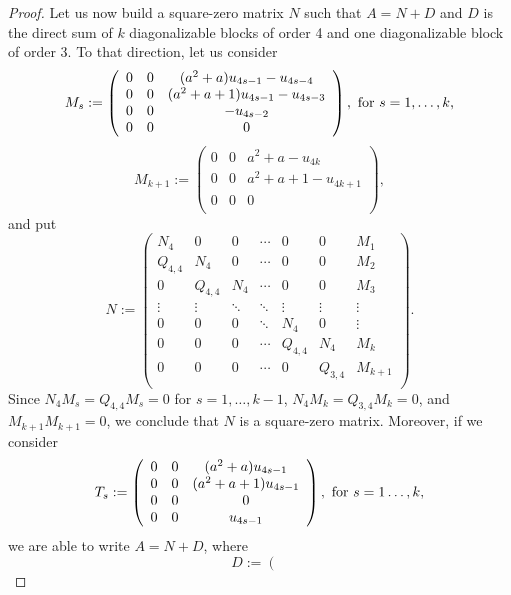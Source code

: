 \documentclass{amsart}
\theoremstyle{definition}
\theoremstyle{remark}
\numberwithin{equation}{section}
\begin{document}
\begin{proof}
Let us now build a square-zero matrix $N$ such that $A=N+D$ and $D$ is the direct sum of $k$ diagonalizable blocks of order 4 and one diagonalizable block of order 3. To that direction, let us consider
$$M_s:=\left(
 \begin{array}{ccc}
  0 & 0 & (a^2+a)u_{4s-1}-u_{4s-4} \\
  0 & 0 & (a^2+a+1)u_{4s-1}-u_{4s-3} \\
   0 & 0 & -u_{4s-2} \\
    0 & 0 & 0 \\
   \end{array}
   \right),\hbox{ for $s=1,\dots, k$,}
$$
$$M_{k+1}:=\left(
                    \begin{array}{ccc}
                      0 & 0 & a^2+a-u_{4k} \\
                      0 & 0 & a^2+a+1-u_{4k+1} \\
                      0 & 0 & 0 \\
                    \end{array}
                  \right),$$
and put
$$N:=\left(
      \begin{array}{ccccccc}
        N_4 & 0 & 0 & \cdots & 0 & 0 & M_1 \\
        Q_{4,4} & N_4 & 0 & \cdots & 0 & 0 & M_2 \\
        0 & Q_{4,4} & N_4 & \cdots & 0 & 0 & M_3 \\
        \vdots & \vdots & \ddots & \ddots & \vdots & \vdots & \vdots \\
        0 & 0 & 0 & \ddots & N_4 & 0 & \vdots \\
        0 & 0 & 0 & \cdots & Q_{4,4} & N_4 & M_{k} \\
        0 & 0 & 0 & \cdots & 0 & Q_{3,4} & M_{k+1} \\
      \end{array}
    \right).$$
Since  $N_4 M_s=Q_{4,4} M_s=0$ for $s=1,\dots, k-1$, $N_4M_k=Q_{3,4}M_k=0$, and $M_{k+1} M_{k+1}=0$, we conclude that $N$ is a square-zero matrix. Moreover, if we consider
$$
T_s:=\left(
 \begin{array}{ccc}
  0 & 0 & (a^2+a)u_{4s-1} \\
  0 & 0 & (a^2+a+1)u_{4s-1}  \\
  0 & 0 & 0 \\
  0 & 0 & u_{4s-1} \\
  \end{array}
  \right), \hbox{ for $s=1\dots, k$,}
$$ we are able to write $A=N+D$, where
$$D:=\left(
          \begin{array}{ccccc}

\end{array}$$
\end{proof}
\end{document}
